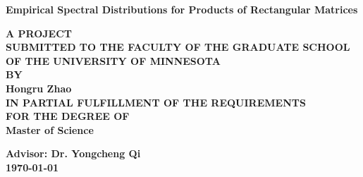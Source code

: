 \documentclass[12pt]{article}
\theoremstyle{plain}
\theoremstyle{definition}
\theoremstyle{remark}
\begin{document}
\begin{titlepage}
   \begin{center}
       \vspace*{1cm}

       \textbf{\large Empirical Spectral Distributions for Products of Rectangular Matrices}

       \vspace{0.5cm}


       \vspace{1.5cm}

       \textbf{A PROJECT \\ SUBMITTED TO THE FACULTY OF THE GRADUATE SCHOOL\\ OF THE UNIVERSITY OF MINNESOTA\\ BY }\\
        \vspace{1 cm}
        \textbf{Hongru Zhao}\\

       \vspace{1cm}
       \textbf{IN PARTIAL FULFILLMENT OF THE REQUIREMENTS\\ FOR THE DEGREE OF\\ Master of Science}
       \vspace{1 cm}

       \vspace{1 cm}
       \textbf{Advisor: Dr. Yongcheng Qi}
       \\
        \vspace{1 cm}
        \textbf{\today}
   \end{center}
\end{titlepage}




\end{document}
